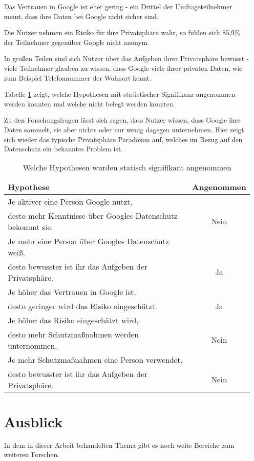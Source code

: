 Das Vertrauen in Google ist eher gering - ein Drittel der Umfrageteilnehmer meint, dass ihre Daten bei Google nicht sicher sind.

Die Nutzer nehmen ein Risiko für ihre Privatsphäre wahr, so fühlen sich 85,9\% der Teilnehmer gegenüber Google nicht anonym.

In großen Teilen sind sich Nutzer über das Aufgeben ihrer Privatsphäre bewusst - viele Teilnehmer glauben zu wissen, dass Google viele ihrer privaten Daten, wie zum Beispiel Telefonnummer der Wohnort kennt.

Tabelle \ref{hypothesenangenommen} zeigt, welche Hypothesen mit statistischer Signifikanz angenommen werden konnten und welche nicht belegt werden konnten.

Zu den Forschungsfragen lässt sich sagen, dass Nutzer wissen, dass Google ihre Daten sammelt, sie aber nichts oder nur wenig dagegen unternehmen. Hier zeigt sich wieder das typische Privatsphäre Paradoxon auf, welches im Bezug auf den Datenschutz ein bekanntes Problem ist.

\begin{table}
	\begin{tabular}[]{l | c }
	Hypothese & Angenommen\\\hline\hline
	Je aktiver eine Person Google nutzt,\\ desto mehr Kenntnisse über Googles Datenschutz bekommt sie. & Nein\\ \hline
	Je mehr eine Person über Googles Datenschutz weiß,\\ desto bewusster ist ihr das Aufgeben der Privatsphäre. & Ja\\ \hline
	Je höher das Vertrauen in Google ist,\\ desto geringer wird das Risiko eingeschätzt.&Ja\\\hline
	Je höher das Risiko eingeschätzt wird,\\ desto mehr Schutzmaßnahmen werden unternommen.&Nein\\\hline
	Je mehr Schutzmaßnahmen eine Person verwendet,\\ desto bewusster ist ihr das Aufgeben der Privatsphäre.&Nein\\\hline
	\end{tabular}
	\caption{Welche Hypothesen wurden statisch signifikant angenommen}\label{hypothesenangenommen}
\end{table}

\section{Ausblick}
In dem in dieser Arbeit behandelten Thema gibt es noch weite Bereiche zum weiteren Forschen.

